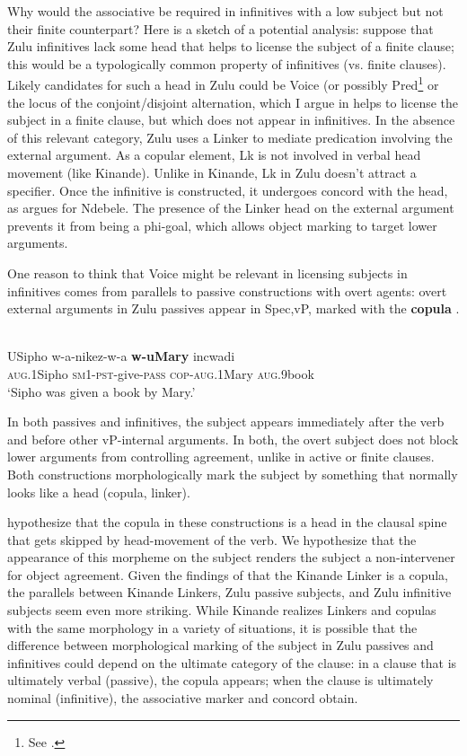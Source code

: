 \documentclass[output=paper,colorlinks,citecolor=brown]{langscibook}
\begin{document}
Why would the associative be required in infinitives with a low subject but not their finite counterpart? Here is a sketch of a potential analysis: suppose that Zulu infinitives lack some head that helps to license the subject of a finite clause; this would be a typologically common property of infinitives (vs. finite clauses).  Likely candidates for such a head in Zulu could be Voice (or possibly Pred\footnote{See \citet{Zeller2013}.} or the locus of the conjoint/disjoint alternation, which I argue in \citet{Halpert2015} helps to license the subject in a finite clause, but which does not appear in infinitives. In the absence of this relevant category, Zulu uses a Linker to mediate predication involving the external argument. As a copular element, Lk is not involved in verbal head movement (like Kinande).
Unlike in Kinande, Lk in Zulu doesn't attract a specifier. Once the infinitive is constructed, it undergoes concord with the head, as \citet{Pietraszko2019} argues for Ndebele.  The presence of the Linker head on the external argument prevents it from being a phi-goal, which allows object marking to target lower arguments.

One reason to think that Voice might be relevant in licensing subjects in infinitives comes from parallels to passive constructions with overt agents: overt external arguments in Zulu passives appear in Spec,vP,  marked with the \textbf{copula} \citep{HalpertZeller2016}.

\ea%
    \label{ex:halpert:21}
    \\
    \gll    USipho 		w-a-nikez-w-a 		\textbf{w-uMary} 			incwadi\\
			\textsc{aug}.1Sipho	\textsc{sm}1-\textsc{pst}-give-\textsc{pass}	\textsc{cop}-\textsc{aug}.1Mary	\textsc{aug}.9book\\
    \glt    `Sipho was given a book by Mary.'
\z 

In both passives and infinitives, the subject appears immediately after the verb and before other vP-internal arguments. In both, the overt subject does not block lower arguments from controlling agreement, unlike in active or finite clauses. Both constructions  morphologically mark the subject by something that normally looks like a head (copula, linker).

\citet{HalpertZeller2016} hypothesize that the copula in these constructions is a head in the clausal spine that gets skipped by head-movement of the verb.  We hypothesize that the appearance of this morpheme on the subject renders the subject a non-intervener for object agreement.  Given the findings of \citet{Schneider-Zioga2015WCCFL, Schneider-Zioga2015ACAL} that the Kinande Linker is a copula, the parallels between Kinande Linkers, Zulu passive subjects, and Zulu infinitive subjects seem even more striking.  While Kinande realizes Linkers and copulas with the same morphology in a variety of situations, it is possible that the difference between morphological marking of the subject in Zulu passives and infinitives could depend on the ultimate category of the clause: in a clause that is ultimately verbal (passive), the copula appears; when the clause is ultimately nominal (infinitive), the associative marker and concord obtain.
\end{document}
